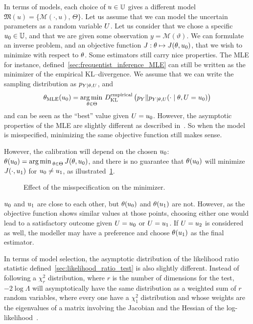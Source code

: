 \documentclass[../../Main_ManuscritThese.tex]{subfiles}
\newcommand\imgpath{/home/victor/acadwriting/Manuscrit/Text/Chapter2/img/}
\begin{document}

In terms of models, each choice of $\uu \in \Uspace$ gives a different model $\mathfrak{M}(u) = \{\mathcal{M}(\cdot, u),\,\Theta\}$. Let us assume that we can model the uncertain parameters as a random variable $\UU$.
Let us consider that we chose a specific $\uu_0 \in \Uspace$, and that we are given some observation $y=\mathscr{M}(\vartheta)$. We can formulate an inverse problem, and an objective function $J:\kk \mapsto J(\kk,\uu_0)$, that we wish to minimize with respect to $\kk$.
Some estimators still carry nice properties. The MLE for instance, defined~\cref{sec:frequentist_inference_MLE} can still be written as the minimizer of the empirical KL--divergence. We assume that we can write the sampling distribution as $p_{Y \mid \KK, \UU}$, and
\begin{equation}
  \estimtxt{\theta}{MLE}(\uu_0)=  \argmin_{\kk \in \Kspace}\DKL[empirical]{p_Y}{p_{Y \mid \theta, \UU}(\cdot \mid \theta, \UU=\uu_0)}
\end{equation}
and can be seen as the ``best'' value given $\UU=\uu_0$. However, the asymptotic properties of the MLE are slightly different as described in~\cite{white_maximum_1982}.
So when the model is misspecified, minimizing the same objective function still makes sense.

However, the calibration will depend on the chosen $\uu_0$: $\estimtxt{\theta}{}(\uu_0) = \argmin_{\theta \in \Theta} J(\theta,\uu_0)$, and there is no guarantee that $\estimtxt{\theta}{}(\uu_0)$ will minimize $J(\cdot, \uu_1)$ for $\uu_0 \neq \uu_1$, as illustrated~\cref{fig:minimizer_misspecification}.

\begin{figure}[ht]
  \centering
  
  \caption{Effect of the misspecification on the minimizer.}
  \label{fig:minimizer_misspecification}
\end{figure}

$\uu_0$ and $\uu_1$ are close to each other, but ${\kk}(\uu_0)$ and ${\kk}(\uu_1)$ are not. However, as the objective function shows similar values at those points, choosing either one would lead to a satisfactory outcome given $\UU = \uu_0$ or $\UU=\uu_1$. If $\UU = \uu_2$ is considered as well, the modeller may have a preference and choose $\estimtxt{\kk}{}(\uu_1)$ as the final estimator.

In terms of model selection, the asymptotic distribution of the likelihood ratio statistic defined~\cref{sec:likelihood_ratio_test} is also slightly different. Instead of following a $\chi^2_{r}$ distribution, where $r$ is the number of dimensions for the test, $-2\log \Lambda$ will asymptotically have the same distribution as a weighted sum of $r$ random variables, where every one have a $\chi^2_1$ distribution and whose weights are the eigenvalues of a matrix involving the Jacobian and the Hessian of the log-likelihood~\cite{kent_robust_1982}.
\end{document}
